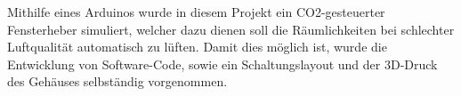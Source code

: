
\label{Einleitung}

Mithilfe eines Arduinos wurde in diesem Projekt ein CO2-gesteuerter Fensterheber simuliert, welcher dazu dienen soll die Räumlichkeiten bei schlechter Luftqualität automatisch zu lüften.
Damit dies möglich ist, wurde die Entwicklung von Software-Code, sowie ein Schaltungslayout und der 3D-Druck des Gehäuses selbständig vorgenommen.